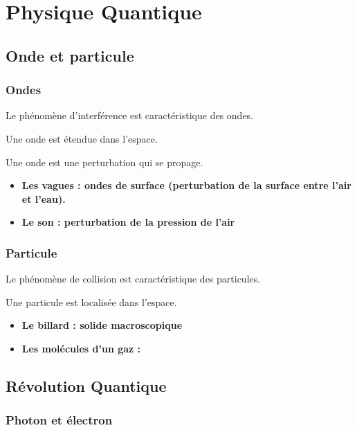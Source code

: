 \chapter{Physique Quantique}

\section{Onde et particule}
\subsection{Ondes}
Le phénomène d'interférence est caractéristique des ondes.
\begin{center}
Une onde est étendue dans l'espace.
\end{center}
\begin{center}
Une onde est une perturbation qui se propage.
\end{center}

\begin{itemize}[leftmargin=1cm, label=, itemsep=1pt]
\item {\bf Les vagues : ondes de surface (perturbation de la surface entre l'air et l'eau).}
\item {\bf Le son : perturbation de la pression de l'air}
\end{itemize}

\subsection{Particule}
Le phénomène de collision est caractéristique des particules.
\begin{center}
Une particule est localisée dans l'espace.
\end{center}
\begin{itemize}[leftmargin=1cm, label=, itemsep=1pt]
\item {\bf Le billard : solide macroscopique}
\item {\bf Les molécules d'un gaz : }
\end{itemize}

\section{Révolution Quantique}
\subsection{Photon et électron}


